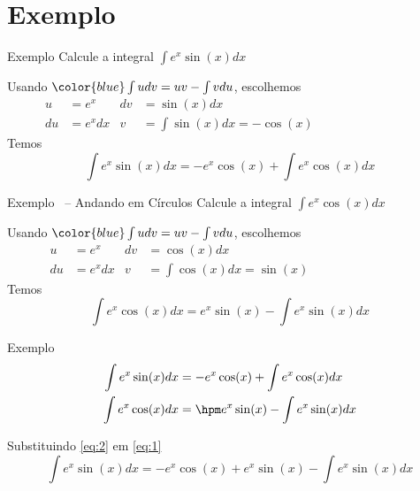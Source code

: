 \addtocounter{exemplo}{1}
\section{Exemplo \theexemplo}

\begin{frame}{Exemplo \theexemplo}
  Calcule a integral \(\int e^x \sin(x) dx\)

  \pause
  Usando \({\color{blue}\int udv = uv - \int v  du}\), escolhemos
  \pause
  \begin{align*}
    u  & = e^x   & dv & = \sin(x) dx                 & \hspace{3cm}~ \\
    du & = e^xdx & v  & = \int \sin(x) dx = -\cos(x) &
  \end{align*}
  \pause
  Temos
  \[
    \int e^x \sin(x) dx = -e^x \cos(x)+ \int e^x \cos(x)dx
  \]
\end{frame}

\begin{frame}{Exemplo \theexemplo\  -- Andando em Círculos}
  Calcule a integral \(\int e^x \cos(x) dx\)

  \pause
  Usando \({\color{blue}\int udv = uv - \int v  du}\), escolhemos
  \pause
  \begin{align*}
    u  & = e^x   & dv & = \cos(x) dx                & \hspace{3cm}~ \\
    du & = e^xdx & v  & = \int \cos(x) dx = \sin(x) &
  \end{align*}
  \pause
  Temos
  \[
    \int e^x \cos(x) dx
    = e^x \sin(x) - \int e^x \sin(x) dx
  \]
\end{frame}

\begin{frame}{Exemplo \theexemplo}
  \begin{align}
    \int e^x \sin(x) dx & = -e^x \cos(x)+ \int e^x \cos(x) dx      \label{eq:1} \\
    \int e^x \cos(x) dx & = \hpm e^x \sin(x) - \int e^x \sin(x) dx \label{eq:2}
  \end{align}

  \pause
  Substituindo \eqref{eq:2} em \eqref{eq:1}
  \[
    \int e^x \sin(x) dx
    = -e^x \cos(x) + e^x \sin(x) - \int e^x \sin(x) dx
  \]
\end{frame}

